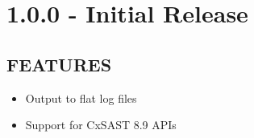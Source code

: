 \section{1.0.0 - Initial Release}
\subsection*{FEATURES}
    \begin{itemize}
        \item Output to flat log files
        \item Support for CxSAST 8.9 APIs
    \end{itemize}


\let\section=\sectionold